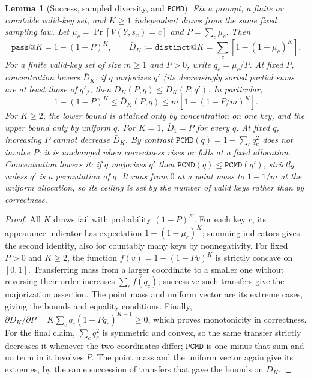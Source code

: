 \documentclass{article}
\newcommand{\1}{\mathbf 1}
\newcommand{\pmd}{\texttt{PCMD}}
\newtheorem{lemma}{Lemma}[section]
\theoremstyle{remark}
\theoremstyle{definition}
\theoremstyle{plain}
\begin{document}
\begin{lemma}[Success, sampled diversity, and \pmd{}]
\label{lem:success-breadth}
Fix a prompt, a finite or countable valid-key set, and $K\ge1$ independent
draws from the same fixed sampling law. Let
$\mu_c=\Pr[V(Y,s_x)=c]$ and $P=\sum_c\mu_c$. Then
\begin{equation}
 \texttt{pass@}K=1-(1-P)^K,\qquad
 \bar D_K:=\texttt{distinct@}K=\sum_c[1-(1-\mu_c)^K].
 \label{eq:success-breadth-identities}
\end{equation}
For a finite valid-key set of size $m\ge1$ and $P>0$, write $q_c=\mu_c/P$.
At fixed $P$, concentration lowers $\bar D_K$: if $q$ majorizes $q'$
(its decreasingly sorted partial sums are at least those of $q'$), then
$\bar D_K(P,q)\le\bar D_K(P,q')$. In particular,
\begin{equation}
 1-(1-P)^K\le\bar D_K(P,q)\le m[1-(1-P/m)^K].
 \label{eq:fixed-success-breadth-bounds}
\end{equation}
For $K\ge2$, the lower bound is attained only by concentration on one key,
and the upper bound only by uniform $q$. For $K=1$, $\bar D_1=P$ for every $q$.
At fixed $q$, increasing $P$ cannot decrease $\bar D_K$.
By contrast $\pmd(q)=1-\sum_c q_c^2$ does not involve $P$: it is unchanged when
correctness rises or falls at a fixed allocation. Concentration lowers it: if
$q$ majorizes $q'$ then $\pmd(q)\le\pmd(q')$, strictly unless $q'$ is a
permutation of $q$. It runs from $0$ at a point mass to
$1-1/m$ at the uniform allocation, so its ceiling is set by the number of
valid keys rather than by correctness.
\end{lemma}
\begin{proof}
All $K$ draws fail with probability $(1-P)^K$. For each key $c$, its
appearance indicator has expectation $1-(1-\mu_c)^K$; summing indicators
gives the second identity, also for countably many keys by nonnegativity.
For fixed $P>0$ and $K\ge2$, the function
$f(v)=1-(1-Pv)^K$ is strictly concave on $[0,1]$.
Transferring mass from a larger coordinate to a smaller one without reversing
their order increases $\sum_c f(q_c)$; successive such transfers give the
majorization assertion. The point mass and uniform vector are its extreme
cases, giving the bounds and equality conditions. Finally,
$\partial\bar D_K/\partial P=K\sum_c q_c(1-Pq_c)^{K-1}\ge0$,
which proves monotonicity in correctness.
For the final claim, $\sum_c q_c^2$ is symmetric and convex, so the
same transfer strictly decreases it whenever the two coordinates differ;
$\pmd$ is one minus that sum and no term in it involves $P$. The point mass and
the uniform vector again give its extremes, by the same succession of transfers
that gave the bounds on $\bar D_K$.
\end{proof}
\end{document}

